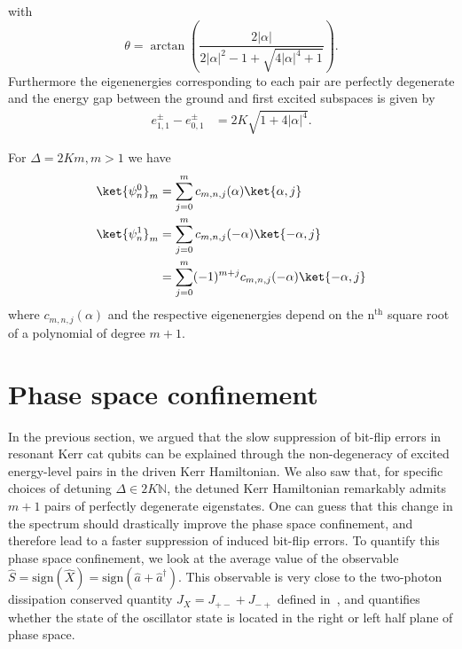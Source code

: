 with
\begin{equation*}
\theta=\arctan\left(\frac{2|\alpha|}{2|\alpha|^2-1+\sqrt{4|\alpha|^4+1}}\right).
\end{equation*}
Furthermore the eigenenergies corresponding to each pair are perfectly degenerate and the energy gap between the ground and first excited subspaces is given by
\begin{equation}
    \begin{split}
        e^\pm_{1,1}-e^\pm_{0,1}  &= 2 K \sqrt{1+4|\alpha|^4}.
    \end{split}
\end{equation}

For $\Delta = 2Km, m > 1 $ we have
\begin{equation*}
    \begin{split}
        \ket{\psi^0_n}_m &= \sum_{j=0}^{m} c_{m,n,j}(\alpha) \ket{\alpha,j} \\
        \ket{\psi^1_n}_m &= \sum_{j=0}^{m} c_{m,n,j}(-\alpha) \ket{-\alpha,j} \\
        &= \sum_{j=0}^{m} (-1)^{m+j} c_{m,n,j}(-\alpha) \ket{-\alpha,j}
    \end{split}
\end{equation*}
where $c_{m,n,j}(\alpha)$ and the respective eigenenergies depend on the $\text{n}^\text{th}$ square root of a polynomial of degree $m+1$.

\section{\label{sec:level4}Phase space confinement}

In the previous section, we argued that the slow suppression of bit-flip errors in resonant Kerr cat qubits can be explained through the non-degeneracy of excited energy-level pairs in the driven Kerr Hamiltonian. We also saw that, for specific choices of detuning $\Delta \in 2K\mathbb{N}$, the detuned Kerr Hamiltonian remarkably admits $m+1$ pairs of perfectly degenerate eigenstates. One can guess that this change in the spectrum should drastically improve the phase space confinement, and therefore lead to a faster suppression of induced bit-flip errors. To quantify this phase space confinement, we look at the average value of the observable $\hat S=\text{sign}(\hat X)=\text{sign}(\hat a+\hat a^\dag)$. This observable is very close to the two-photon dissipation conserved quantity $J_X=J_{+-}+J_{-+}$ defined in~\cite{Mirrahimi2014}, and quantifies whether the state of the oscillator state is located in the right or left half plane of phase space.  

